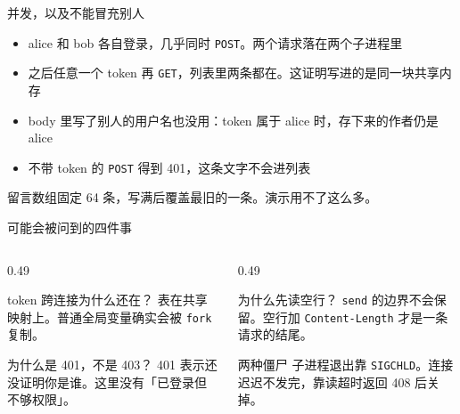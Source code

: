 \documentclass[aspectratio=169,11pt,professionalfonts]{ctexbeamer}
\begin{document}
\begin{frame}{并发，以及不能冒充别人}
\begin{itemize}
  \item alice 和 bob 各自登录，几乎同时 \texttt{POST}。两个请求落在两个子进程里
  \item 之后任意一个 token 再 \texttt{GET}，列表里两条都在。这证明写进的是同一块共享内存
  \item body 里写了别人的用户名也没用：token 属于 alice 时，存下来的作者仍是 alice
  \item 不带 token 的 \texttt{POST} 得到 401，这条文字不会进列表
\end{itemize}
\vspace{0.55em}
留言数组固定 64 条，写满后覆盖最旧的一条。演示用不了这么多。
\end{frame}

\begin{frame}{可能会被问到的四件事}
\begin{columns}[T,onlytextwidth]
\begin{column}{0.49\textwidth}
\begin{block}{token 跨连接为什么还在？}
{\small 表在共享映射上。普通全局变量确实会被 \texttt{fork} 复制。}
\end{block}
\begin{block}{为什么是 401，不是 403？}
{\small 401 表示还没证明你是谁。这里没有「已登录但不够权限」。}
\end{block}
\end{column}
\begin{column}{0.49\textwidth}
\begin{block}{为什么先读空行？}
{\small \texttt{send} 的边界不会保留。空行加 \texttt{Content-Length} 才是一条请求的结尾。}
\end{block}
\begin{block}{两种僵尸}
{\small 子进程退出靠 \texttt{SIGCHLD}。连接迟迟不发完，靠读超时返回 408 后关掉。}
\end{block}
\end{column}
\end{columns}
\end{frame}
\end{document}
